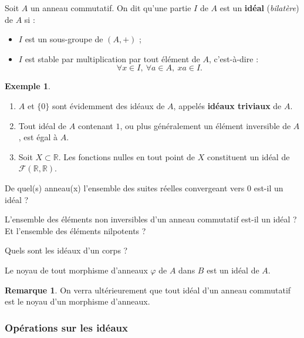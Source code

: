 \documentclass[french]{article}
\newcommand{\R}{\mathbb{R}}
\theoremstyle{plain}
\theoremstyle{definition}
\newtheorem*{ex}{Exemple}
\newtheorem*{rmq}{Remarque}
\theoremstyle{remark}
\begin{document}
\begin{dfn}
	Soit $A$ un anneau commutatif. On dit qu'une partie $I$ de $A$ est un \textbf{idéal} (\textit{bilatère}) de $A$ si :
	\begin{itemize}
		\item $I$ est un sous-groupe de $(A,+)$ ;
		\item $I$ est stable par multiplication par tout élément de $A$, c'est-à-dire :
		$$\forall x\in I,\ \forall a\in A,\ xa\in I.$$
	\end{itemize}
\end{dfn}

\begin{ex}
	\begin{enumerate}
		\item $A$ et $\{0\}$ sont évidemment des idéaux de $A$, appelés \textbf{idéaux triviaux} de $A$.
		\item Tout idéal de $A$ contenant $1$, ou plus généralement un élément inversible de $A$, est égal à $A$.
		\item Soit $X\subset\R$. Les fonctions nulles en tout point de $X$ constituent un idéal de $\mathcal{F}(\R,\R)$.
	\end{enumerate}
\end{ex}

\begin{exo}
	De quel(s) anneau(x) l'ensemble des suites réelles convergeant vers $0$ est-il un idéal  ?
\end{exo}

\begin{exo}
	L'ensemble des éléments non inversibles d'un anneau commutatif est-il un idéal ? Et l'ensemble des éléments nilpotents ?
\end{exo}

\begin{exo}
	Quels sont les idéaux d'un corps ?
\end{exo}

\begin{prop}%
	Le noyau de tout morphisme d'anneaux $\varphi$ de $A$ dans $B$ est un idéal de $A$.
\end{prop}

\begin{rmq}
	On verra ultérieurement que tout idéal d'un anneau commutatif est le noyau d'un morphisme d'anneaux.
\end{rmq}

\subsubsection*{Opérations sur les idéaux}
\end{document}
